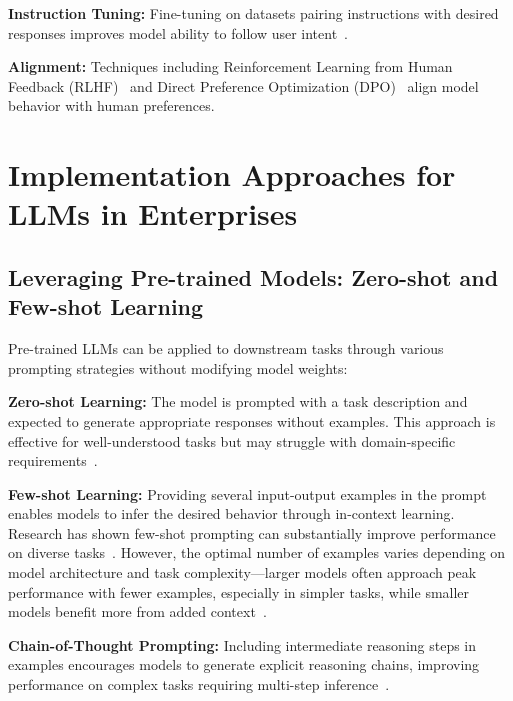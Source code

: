 \textbf{Instruction Tuning:} Fine-tuning on datasets pairing instructions with desired responses improves model ability to follow user intent~\cite{wei2022flan,ouyang2022instructgpt}.

\textbf{Alignment:} Techniques including Reinforcement Learning from Human Feedback (RLHF)~\cite{christiano2017rlhf,ouyang2022instructgpt} and Direct Preference Optimization (DPO)~\cite{rafailov2024dpo} align model behavior with human preferences.

\section{Implementation Approaches for LLMs in Enterprises}
\label{sec:lit_implementation}

\subsection{Leveraging Pre-trained Models: Zero-shot and Few-shot Learning}

Pre-trained LLMs can be applied to downstream tasks through various prompting strategies without modifying model weights:

\textbf{Zero-shot Learning:} The model is prompted with a task description and expected to generate appropriate responses without examples. This approach is effective for well-understood tasks but may struggle with domain-specific requirements~\cite{brown2020gpt3}.

\textbf{Few-shot Learning:} Providing several input-output examples in the prompt enables models to infer the desired behavior through in-context learning. Research has shown few-shot prompting can substantially improve performance on diverse tasks~\cite{brown2020gpt3}. However, the optimal number of examples varies depending on model architecture and task complexity---larger models often approach peak performance with fewer examples, especially in simpler tasks, while smaller models benefit more from added context~\cite{brown2020gpt3}.%

\textbf{Chain-of-Thought Prompting:} Including intermediate reasoning steps in examples encourages models to generate explicit reasoning chains, improving performance on complex tasks requiring multi-step inference~\cite{wei2022cot}.

